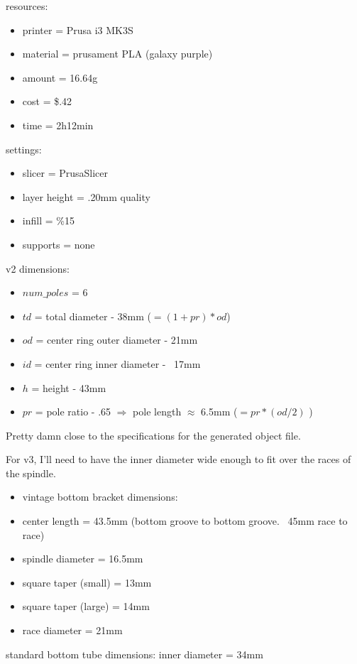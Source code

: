 \documentclass[11pt]{article} %
\begin{document}
resources:
\begin{itemize}
\item printer = Prusa i3 MK3S
\item material = prusament PLA (galaxy purple)
\item amount = 16.64g
\item cost = \$.42
\item time = 2h12min
\end{itemize}
settings:
\begin{itemize}
\item slicer = PrusaSlicer
\item layer height = .20mm quality
\item infill = \%15
\item supports = none
\end{itemize}




v2 dimensions:
\begin{itemize}
\item $num\_poles$ = 6
\item $td$ = total diameter - 38mm ($=(1+pr)*od$)
\item $od$ = center ring outer diameter - 21mm
\item $id$ = center ring inner diameter - ~17mm
\item $h$ = height - 43mm
\item $pr$ = pole ratio - .65 $\Rightarrow$ pole length $\approx$ 6.5mm ($= pr*(od/2)$ )
\end{itemize}



Pretty damn close to the specifications for the generated object file.

For v3, I’ll need to have the inner diameter wide enough to fit over the races of the spindle.

\begin{itemize}
\item vintage bottom bracket dimensions:
\item center length = 43.5mm (bottom groove to bottom groove. ~45mm race to race)
\item spindle diameter = 16.5mm
\item square taper (small) = 13mm
\item square taper (large) = 14mm
\item race diameter = 21mm
\end{itemize}

standard bottom tube dimensions:
inner diameter = 34mm
\end{document}
